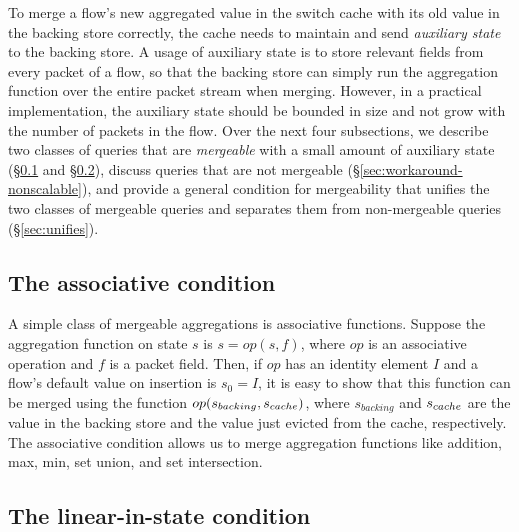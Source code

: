 To merge a flow's new aggregated value in the switch cache with its old value in the backing store
correctly, the cache needs to maintain and send {\em auxiliary state} to the
backing store.  A \naive usage of auxiliary state is to store relevant fields
from every packet of a flow, so that the backing store can simply run the
aggregation function over the entire packet stream when merging.  However, in a
practical implementation, the auxiliary state should be bounded in size and not
grow with the number of packets in the flow. Over the next four subsections, we
describe two classes of queries that are {\em mergeable} with a small amount of
auxiliary state (\S\ref{sec:associative} and
\S\ref{sec:linear-in-state-description}), discuss queries that are not
mergeable (\S\ref{sec:workaround-nonscalable}), and provide a general condition
for mergeability that unifies the two classes of mergeable queries and 
separates them from non-mergeable queries (\S\ref{sec:unifies}).

\subsection{The associative condition}
\label{sec:associative}

A simple class of mergeable aggregations is associative functions.
Suppose the aggregation function on state $s$ is $s = op(s, f)$,
where $op$ is an associative operation and $f$ is a packet field. Then, if $op$
has an identity element $I$ and a flow's default value on insertion is $s_0 =
I$, it is easy to show that this function can be merged using the function
$op(s_{backing}, s_{cache})$, where $s_{backing}$ and $s_{cache}$ are the value in
the backing store and the value just evicted from the cache, respectively. The
associative condition allows us to merge aggregation functions like addition,
max, min, set union, and set intersection.

\subsection{The linear-in-state condition}
\label{sec:linear-in-state-description}

